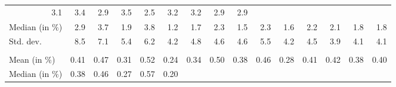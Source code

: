 \begin{tabular}{lllllllllllllll}
  \multicolumn{1}{r}{3.1} &
  \multicolumn{1}{r}{3.4} &
  \multicolumn{1}{r}{2.9} &
  \multicolumn{1}{r}{3.5} &
  \multicolumn{1}{r}{2.5} &
  \multicolumn{1}{r}{3.2} &
  \multicolumn{1}{r}{3.2} &
  \multicolumn{1}{r}{2.9} &
  \multicolumn{1}{r}{2.9} \\
\multicolumn{1}{l}{\hspace{2em}Median (in $\%$)} &
  \multicolumn{1}{|r}{2.9} &
  \multicolumn{1}{r}{3.7} &
  \multicolumn{1}{r}{1.9} &
  \multicolumn{1}{r}{3.8} &
  \multicolumn{1}{r}{1.2} &
  \multicolumn{1}{r}{1.7} &
  \multicolumn{1}{r}{2.3} &
  \multicolumn{1}{r}{1.5} &
  \multicolumn{1}{r}{2.3} &
  \multicolumn{1}{r}{1.6} &
  \multicolumn{1}{r}{2.2} &
  \multicolumn{1}{r}{2.1} &
  \multicolumn{1}{r}{1.8} &
  \multicolumn{1}{r}{1.8} \\
\multicolumn{1}{l}{\hspace{2em}Std. dev.} &
  \multicolumn{1}{|r}{8.5} &
  \multicolumn{1}{r}{7.1} &
  \multicolumn{1}{r}{5.4} &
  \multicolumn{1}{r}{6.2} &
  \multicolumn{1}{r}{4.2} &
  \multicolumn{1}{r}{4.8} &
  \multicolumn{1}{r}{4.6} &
  \multicolumn{1}{r}{4.6} &
  \multicolumn{1}{r}{5.5} &
  \multicolumn{1}{r}{4.2} &
  \multicolumn{1}{r}{4.5} &
  \multicolumn{1}{r}{3.9} &
  \multicolumn{1}{r}{4.1} &
  \multicolumn{1}{r}{4.1} \\
\multicolumn{1}{l}{\hspace{1em}{\textit{Elasticity} ($\widehat{\beta}$)}} &
  \multicolumn{1}{|r}{} &
  \multicolumn{1}{r}{} &
  \multicolumn{1}{r}{} &
  \multicolumn{1}{r}{} &
  \multicolumn{1}{r}{} &
  \multicolumn{1}{r}{} &
  \multicolumn{1}{r}{} &
  \multicolumn{1}{r}{} &
  \multicolumn{1}{r}{} &
  \multicolumn{1}{r}{} &
  \multicolumn{1}{r}{} &
  \multicolumn{1}{r}{} &
  \multicolumn{1}{r}{} &
  \multicolumn{1}{r}{} \\
\multicolumn{1}{l}{\hspace{2em}Mean (in $\%$)} &
  \multicolumn{1}{|r}{0.41} &
  \multicolumn{1}{r}{0.47} &
  \multicolumn{1}{r}{0.31} &
  \multicolumn{1}{r}{0.52} &
  \multicolumn{1}{r}{0.24} &
  \multicolumn{1}{r}{0.34} &
  \multicolumn{1}{r}{0.50} &
  \multicolumn{1}{r}{0.38} &
  \multicolumn{1}{r}{0.46} &
  \multicolumn{1}{r}{0.28} &
  \multicolumn{1}{r}{0.41} &
  \multicolumn{1}{r}{0.42} &
  \multicolumn{1}{r}{0.38} &
  \multicolumn{1}{r}{0.40} \\
\multicolumn{1}{l}{\hspace{2em}Median (in $\%$)} &
  \multicolumn{1}{|r}{0.38} &
  \multicolumn{1}{r}{0.46} &
  \multicolumn{1}{r}{0.27} &
  \multicolumn{1}{r}{0.57} &
  \multicolumn{1}{r}{0.20} &

\end{tabular}

